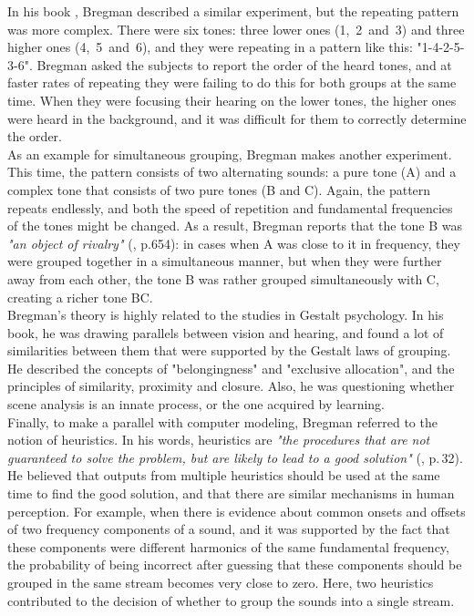 In his book \cite{Bregman1990}, Bregman described a similar experiment, but the repeating pattern was more complex. There were six tones: three lower ones (1,~2~and~3) and three higher ones (4,~5~and~6), and they were repeating in a pattern like this: "1-4-2-5-3-6". Bregman asked the subjects to report the order of the heard tones, and at faster rates of repeating they were failing to do this for both groups at the same time. When they were focusing their hearing on the lower tones, the higher ones were heard in the background, and it was difficult for them to correctly determine the order.\\

As an example for simultaneous grouping, Bregman makes another experiment. This time, the pattern consists of two alternating sounds: a pure tone (A) and a complex tone that consists of two pure tones (B and C). Again, the pattern repeats endlessly, and both the speed of repetition and fundamental frequencies of the tones might be changed. As a result, Bregman reports that the tone B was \textit{"an object of rivalry"} (\cite{Bregman1990}, p.654): in cases when A was close to it in frequency, they were grouped together in a simultaneous manner, but when they were further away from each other, the tone B was rather grouped simultaneously with C, creating a richer tone BC.\\

Bregman's theory is highly related to the studies in Gestalt psychology. In his book, he was drawing parallels between vision and hearing, and found a lot of similarities between them that were supported by the Gestalt laws of grouping. He described the concepts of "belongingness" and "exclusive allocation", and the principles of similarity, proximity and closure. Also, he was questioning whether scene analysis is an innate process, or the one acquired by learning.\\

Finally, to make a parallel with computer modeling, Bregman referred to the notion of heuristics. In his words, heuristics are \textit{"the procedures that are not guaranteed to solve the problem, but are likely to lead to a good solution"} (\cite{Bregman1990}, p.\,32). He believed that outputs from multiple heuristics should be used at the same time to find the good solution, and that there are similar mechanisms in human perception. For example, when there is evidence about common onsets and offsets of two frequency components of a sound, and it was supported by the fact that these components were different harmonics of the same fundamental frequency, the probability of being incorrect after guessing that these components should be grouped in the same stream becomes very close to zero. Here, two heuristics contributed to the decision of whether to group the sounds into a single stream.

